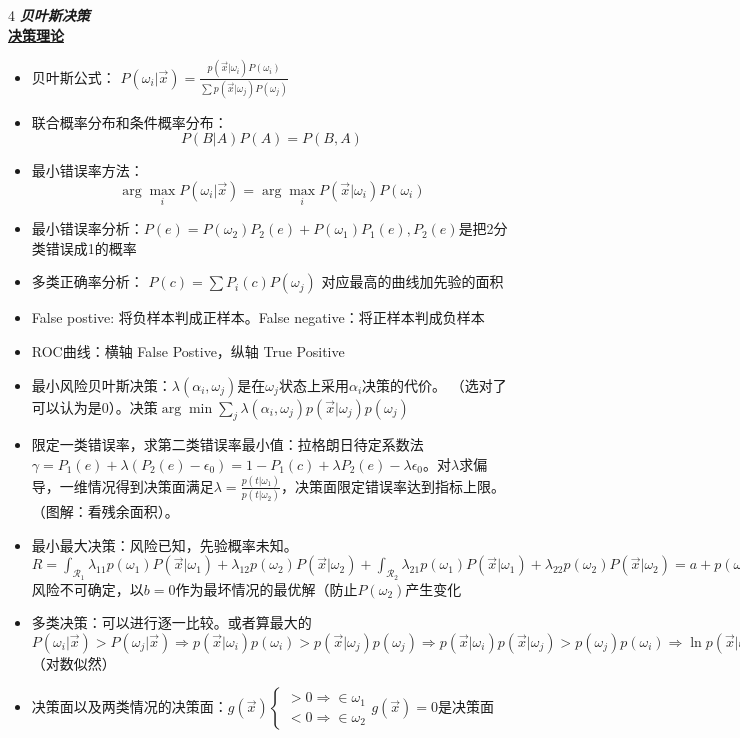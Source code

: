 \documentclass[UTF8,a4paper,landscape,compress]{paper}
\renewcommand{\subsection}[1]{{\small\textbf{\underline{#1}}}\\ }
\renewcommand{\section}[1]{{\normalsize\textbf{\emph{#1}}}\\ }
\newcommand{\List}[1]{\begin{itemize}[fullwidth,itemindent=0em] #1 \end{itemize}}
\begin{document}
\footnotesize
\begin{multicols}{4}
\section{贝叶斯决策}
\subsection{决策理论}
\List{
    \item {贝叶斯公式： $\displaystyle{P(\omega_i|\vec x) = \frac{p(\vec x|\omega_i)P(\omega_i)}
    {\sum p(\vec x|\omega_j)P(\omega_j)}}$}
    \item {联合概率分布和条件概率分布：$$P(B|A)P(A) = P(B,A)$$}
    \item {最小错误率方法：$$\arg\max_i P(\omega_i|\vec x) = \arg\max_i P(\vec x | \omega_i)P(\omega_i)$$}
    \item {最小错误率分析：$P(e) = P(\omega_2)P_2(e) + P(\omega_1)P_1(e), P_2(e)$是把2分类错误成1的概率}
    \item {多类正确率分析： $P(c) = \sum P_i(c) P(\omega_j)$ 对应最高的曲线加先验的面积}
    \item {False postive: 将负样本判成正样本。False negative：将正样本判成负样本}
    \item {ROC曲线：横轴 False Postive，纵轴 True Positive}
    \item {最小风险贝叶斯决策：$\lambda(\alpha_i,\omega_j)$是在$\omega_j$状态上采用$\alpha_i$决策的代价。
    （选对了可以认为是0）。决策$\arg\min\sum_j\lambda(\alpha_i,\omega_j)p(\vec x | \omega_j)p(\omega_j)$}
    \item {限定一类错误率，求第二类错误率最小值：拉格朗日待定系数法 $\gamma = P_1(e) + \lambda(P_2(e) - \epsilon_0) = 1 - P_1(c) + \lambda P_2(e) - \lambda\epsilon_0$。对$\lambda$求偏导，一维情况得到决策面满足$\lambda = \frac{p(t|\omega_1)}{p(t|\omega_2)}$，决策面限定错误率达到指标上限。（图解：看残余面积）。}
    \item {最小最大决策：风险已知，先验概率未知。$R = \int_{\mathcal R_1}\lambda_{11}p(\omega_1)P(\vec x|\omega_1) + \lambda_{12}p(\omega_2)P(\vec x|\omega_2) + \int_{\mathcal R_2}\lambda_{21}p(\omega_1)P(\vec x|\omega_1) + \lambda_{22}p(\omega_2)P(\vec x|\omega_2) = a + p(\omega_1)b$风险不可确定，以$b=0$作为最坏情况的最优解（防止$P(\omega_2)$产生变化}
    \item {多类决策：可以进行逐一比较。或者算最大的$P(\omega_i|\vec x) > P(\omega_j|\vec x)\Rightarrow p(\vec x|\omega_i)p(\omega_i) > p(\vec x|\omega_j)p(\omega_j) \Rightarrow {p(\vec x|\omega_i)}{p(\vec x|\omega_j)} > {p(\omega_j)}{p(\omega_i)} \Rightarrow \ln p(\vec x|\omega_i) + \ln p(\omega_i) > \ln p(\vec x|\omega_j)\ln p(\omega_j)$（对数似然）}
    \item {决策面以及两类情况的决策面：$g(\vec x) \begin{cases} >0 \Rightarrow \in \omega_1 \\<0 \Rightarrow \in \omega_2\end{cases}g(\vec x) = 0$是决策面}
}

\end{multicols}
\end{document}
